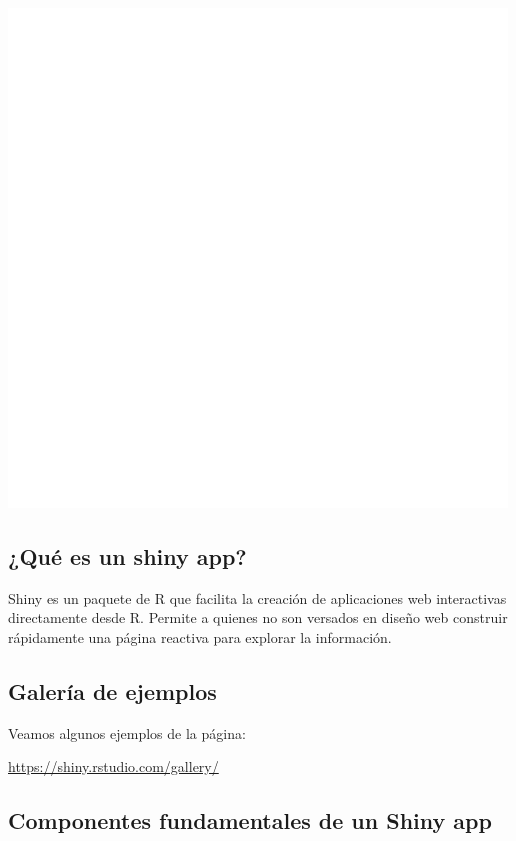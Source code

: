 \documentclass[]{book}
\begin{document}
\href{https://shiny.rstudio.com/}{\includegraphics[width=5.20833in,height=\textheight]{img/shiny_logo.png}}

\hypertarget{que-es-un-shiny-app}{%
\subsection{¿Qué es un shiny app?}\label{que-es-un-shiny-app}}

Shiny es un paquete de R que facilita la creación de aplicaciones web interactivas directamente desde R. Permite a quienes no son versados en diseño web construir rápidamente una página reactiva para explorar la información.

\hypertarget{galeria-de-ejemplos}{%
\subsection{Galería de ejemplos}\label{galeria-de-ejemplos}}

Veamos algunos ejemplos de la página:

 \url{https://shiny.rstudio.com/gallery/}

\hypertarget{componentes-fundamentales-de-un-shiny-app}{%
\subsection{Componentes fundamentales de un Shiny app}\label{componentes-fundamentales-de-un-shiny-app}}
\end{document}
